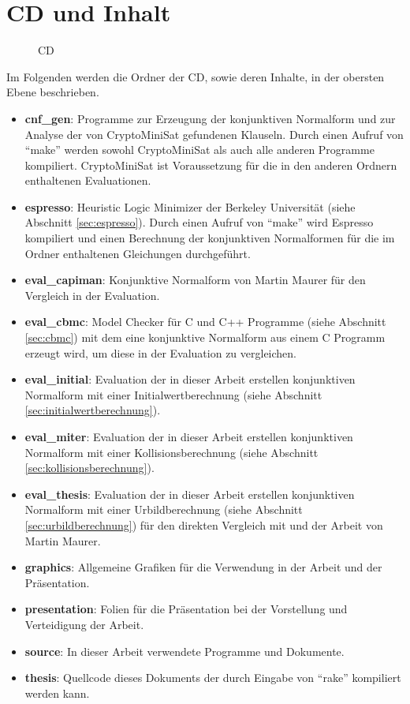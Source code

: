 \chapter{CD und Inhalt}

\begin{figure}[!ht]
\centering
{}
\caption{CD}
\label{tbl:a-cd}
\end{figure}

\clearpage

Im Folgenden werden die Ordner der CD, sowie deren Inhalte, in der obersten Ebene beschrieben.

\begin{itemize}
  \setlength{\itemsep}{0.5cm}
  \item \textbf{cnf\_gen}: Programme zur Erzeugung der konjunktiven Normalform und zur Analyse der von CryptoMiniSat gefundenen Klauseln.
                          Durch einen Aufruf von "`make"' werden sowohl CryptoMiniSat als auch alle anderen Programme kompiliert.
                          CryptoMiniSat ist Voraussetzung für die in den anderen Ordnern enthaltenen Evaluationen.
  \item \textbf{espresso}: Heuristic Logic Minimizer der Berkeley Universität (siehe Abschnitt \ref{sec:espresso}).
                           Durch einen Aufruf von "`make"' wird Espresso kompiliert und einen Berechnung der
                           konjunktiven Normalformen für die im Ordner enthaltenen Gleichungen durchgeführt.
  \item \textbf{eval\_capiman}: Konjunktive Normalform von Martin Maurer für den Vergleich in der Evaluation.
  \item \textbf{eval\_cbmc}: Model Checker für C und C++ Programme (siehe Abschnitt \ref{sec:cbmc}) mit dem eine konjunktive
                             Normalform aus einem C Programm erzeugt wird, um diese in der Evaluation zu vergleichen.  
  \item \textbf{eval\_initial}: Evaluation der in dieser Arbeit erstellen konjunktiven Normalform mit einer Initialwertberechnung (siehe Abschnitt \ref{sec:initialwertberechnung}).
  \item \textbf{eval\_miter}: Evaluation der in dieser Arbeit erstellen konjunktiven Normalform mit einer Kollisionsberechnung (siehe Abschnitt \ref{sec:kollisionsberechnung}).
  \item \textbf{eval\_thesis}: Evaluation der in dieser Arbeit erstellen konjunktiven Normalform mit einer Urbildberechnung (siehe Abschnitt \ref{sec:urbildberechnung}) für
                               den direkten Vergleich mit  und der Arbeit von Martin Maurer.
  \item \textbf{graphics}: Allgemeine Grafiken für die Verwendung in der Arbeit und der Präsentation.
  \item \textbf{presentation}: Folien für die Präsentation bei der Vorstellung und Verteidigung der Arbeit.
  \item \textbf{source}: In dieser Arbeit verwendete Programme und Dokumente.
  \item \textbf{thesis}: Quellcode dieses Dokuments der durch Eingabe von "`rake"' kompiliert werden kann.
\end{itemize}
